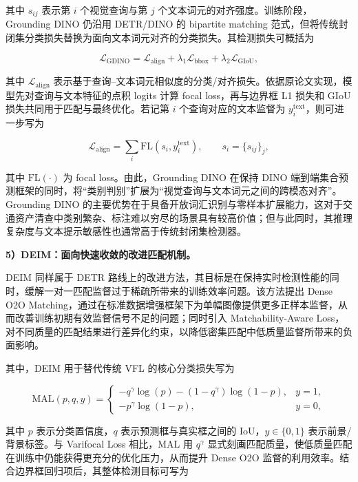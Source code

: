 其中 $s_{ij}$ 表示第 $i$ 个视觉查询与第 $j$ 个文本词元的对齐强度。训练阶段，Grounding DINO 仍沿用 DETR/DINO 的 bipartite matching 范式，但将传统封闭集分类损失替换为面向文本词元对齐的分类损失。其检测损失可概括为

\begin{equation}
\mathcal{L}_{\text{GDINO}}=\mathcal{L}_{\text{align}}+\lambda_{1}\mathcal{L}_{\text{bbox}}+\lambda_{2}\mathcal{L}_{\text{GIoU}},
\end{equation}

其中 $\mathcal{L}_{\text{align}}$ 表示基于查询--文本词元相似度的分类/对齐损失。依据原论文实现，模型先对查询与文本特征的点积 logits 计算 focal loss，再与边界框 L1 损失和 GIoU 损失共同用于匹配与最终优化。若记第 $i$ 个查询对应的文本监督为 $y_i^{\text{text}}$，则可进一步写为

\begin{equation}
\mathcal{L}_{\text{align}}=\sum_{i}\mathrm{FL}(s_i,y_i^{\text{text}}),\qquad s_i=\{s_{ij}\}_{j},
\end{equation}

其中 $\mathrm{FL}(\cdot)$ 为 focal loss。由此，Grounding DINO 在保持 DINO 端到端集合预测框架的同时，将“类别判别”扩展为“视觉查询与文本词元之间的跨模态对齐”。Grounding DINO 的主要优势在于具备开放词汇识别与零样本扩展能力，这对于交通资产清查中类别繁杂、标注难以穷尽的场景具有较高价值；但与此同时，其推理复杂度与文本提示敏感性也通常高于传统封闭集检测器。

\noindent\textbf{5）DEIM：面向快速收敛的改进匹配机制。}

DEIM 同样属于 DETR 路线上的改进方法，其目标是在保持实时检测性能的同时，缓解一对一匹配监督过于稀疏所带来的训练效率问题\cite{huang2025deim}。该方法提出 Dense O2O Matching，通过在标准数据增强框架下为单幅图像提供更多正样本监督，从而改善训练初期有效监督信号不足的问题；同时引入 Matchability-Aware Loss，对不同质量的匹配结果进行差异化约束，以降低密集匹配中低质量监督所带来的负面影响。

其中，DEIM 用于替代传统 VFL 的核心分类损失写为

\begin{equation}
\mathrm{MAL}(p,q,y)=
\begin{cases}
-q^{\gamma}\log(p)-(1-q^{\gamma})\log(1-p), & y=1,\\
-p^{\gamma}\log(1-p), & y=0,
\end{cases}
\end{equation}

其中 $p$ 表示分类置信度，$q$ 表示预测框与真实框之间的 IoU，$y\in\{0,1\}$ 表示前景/背景标签。与 Varifocal Loss 相比，MAL 用 $q^{\gamma}$ 显式刻画匹配质量，使低质量匹配在训练中仍能获得更充分的优化压力，从而提升 Dense O2O 监督的利用效率。结合边界框回归项后，其整体检测目标可写为

